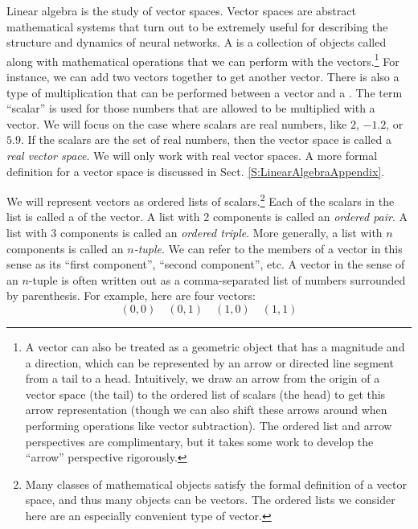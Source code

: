     Linear algebra is the study of vector spaces. Vector spaces are abstract
mathematical systems that turn out to be extremely useful for describing the 
structure and dynamics of neural networks. A  is a 
collection of objects called  along with mathematical 
operations that we can perform with the vectors.\footnote{A vector can also be treated as a geometric object that has a magnitude and a direction, which can be represented by an arrow or directed line segment from a tail to a head. Intuitively, we draw an arrow from the origin of a vector space (the tail) to the ordered list of scalars (the head) to get this arrow representation (though we can also shift these arrows around when performing operations like vector subtraction). The ordered list and arrow perspectives are complimentary, but it takes some work to develop the ``arrow'' perspective rigorously.}\label{headTail}  For instance, we can add two vectors together to get another vector. There is also a type of 
multiplication that can be performed between a vector and a . The term ``scalar'' is used for those numbers that are allowed to be 
multiplied with a vector. We will focus on the case where scalars are real numbers, like $2$, $-1.2$, or $5.9$. If the scalars are the set of real numbers, then the 
vector space is called a {\em real vector space}. We will only work with real
vector spaces. A more formal definition for a vector space is discussed in 
Sect. \ref{S:LinearAlgebraAppendix}. 

We will represent vectors as ordered lists of scalars.\footnote{ Many classes of mathematical objects satisfy the formal definition
of a vector space, and thus many objects can be vectors. The ordered lists we consider here are an especially convenient type of vector.} Each of the scalars in the list is called a  
of the vector. A list with 2 components is called an {\em ordered pair}. A 
list with 3 components is called an {\em ordered triple}. More generally, a
list with $n$ components is called an {\em $n$-tuple}. We can refer to the
members of a vector in this sense  as its ``first component'',  ``second component'', etc.
A vector in the sense of an $n$-tuple is often 
written out as a comma-separated list of numbers surrounded by parenthesis. 
For example, here are four vectors:
\begin{equation*}
    (0,0) \quad (0,1) \quad (1,0) \quad (1,1) 
\end{equation*}

